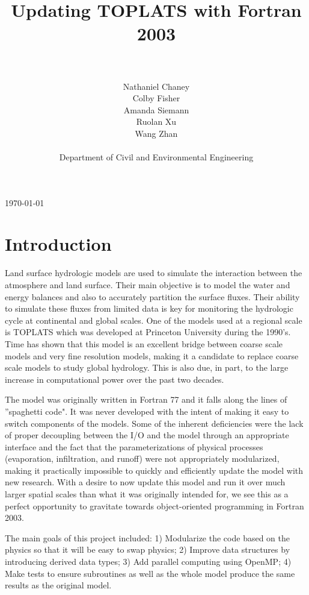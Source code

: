 \documentclass[pdftex,12pt,a4paper]{article}
\title{Updating TOPLATS with Fortran 2003}
\author{\\ \\ Nathaniel Chaney\\ Colby Fisher\\ Amanda Siemann\\ Ruolan Xu\\ Wang Zhan \\ \\ Department of Civil and Environmental Engineering}
\date{}
\begin{document}
\maketitle
\vfill
\begin{center}
{\large \today}
\end{center}

\section{Introduction}
Land surface hydrologic models are used to simulate the interaction between the atmosphere and land surface. Their main objective is to model the water and energy balances and also to accurately partition the surface fluxes. Their ability to simulate these fluxes from limited data is key for monitoring the hydrologic cycle at continental and global scales. One of the models used at a regional scale is TOPLATS which was developed at Princeton University during the 1990's. Time has shown that this model is an excellent bridge between coarse scale models and very fine resolution models, making it a candidate to replace coarse scale models to study global hydrology. This is also due, in part, to the large increase in computational power over the past two decades. 

\vspace{1em}

The model was originally written in Fortran 77 and it falls along the lines of ''spaghetti code". It was never developed with the intent of making it easy to switch components of the models. Some of the inherent deficiencies were the lack of proper decoupling between the I/O and the model through an appropriate interface and the fact that the parameterizations of physical processes (evaporation, infiltration, and runoff) were not appropriately modularized, making it practically impossible to quickly and efficiently update the model with new research. With a desire to now update this model and run it over much larger spatial scales than what it was originally intended for, we see this as a perfect opportunity to gravitate towards object-oriented programming in Fortran 2003. 

\vspace{1em}

The main goals of this project included: 1) Modularize the code based on the physics so that it will be easy to swap physics; 2) Improve data structures by introducing derived data types; 3) Add parallel computing using OpenMP; 4) Make tests to ensure subroutines as well as the whole model produce the same results as the original model. 
\end{document}
